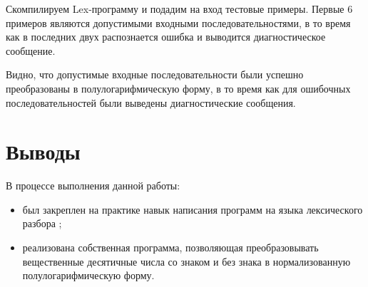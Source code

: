 Скомпилируем Lex-программу и подадим на вход тестовые примеры. Первые 6 примеров являются допустимыми входными последовательностями, в то время как в последних двух распознается ошибка и выводится диагностическое сообщение.


Видно, что допустимые входные последовательности были успешно преобразованы в полулогарифмическую форму, в то время как для ошибочных последовательностей были выведены диагностические сообщения.

\section{Выводы}

В процессе выполнения данной работы:

\begin{itemize}
	\item был закреплен на практике навык написания программ на языка лексического разбора ;
	\item реализована собственная программа, позволяющая преобразовывать вещественные десятичные числа со знаком и без знака в нормализованную полулогарифмическую форму.
\end{itemize}


